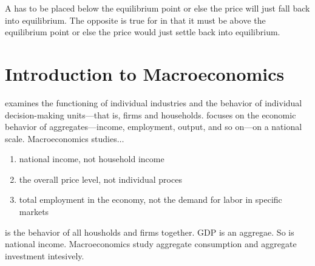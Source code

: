 \documentclass{article}
\begin{document}
A  has to be placed below the equilibrium point or else the price will just fall back into equilibrium. The opposite is true for  in that it must be above the equilibrium point or else the price would just settle back into equilibrium. 

\section{Introduction to Macroeconomics}

 examines the functioning of individual industries and the behavior of individual decision-making units---that is, firms and households.  focuses on the economic behavior of aggregates---income, employment, output, and so on---on a national scale. Macroeconomics studies$\dots$ 
 \begin{enumerate}
   \item national income, not household income 
   \item the overall price level, not individual proces 
   \item total employment in the economy, not the demand for labor in specific markets
 \end{enumerate}

  is the behavior of all housholds and firms together. GDP is an aggregae. So is national income. Macroeconomics study aggregate consumption and aggregate investment intesively. \\ 
\end{document}
